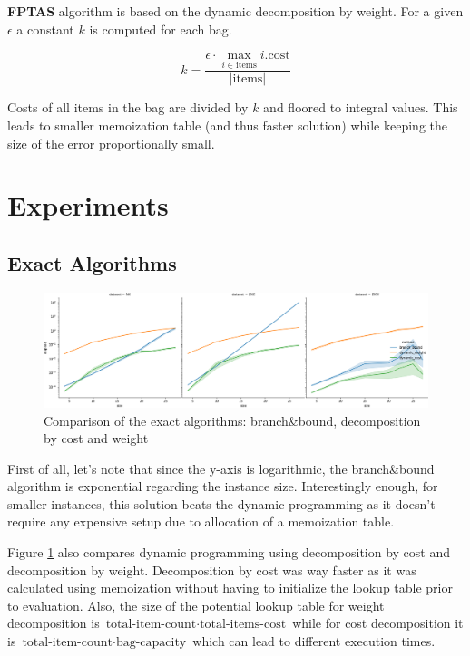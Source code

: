 \documentclass[a4paper,10pt]{article}
\begin{document}
\textbf{FPTAS} algorithm is based on the dynamic decomposition by weight. For a given $\epsilon$ a constant $k$ is computed for each bag. 

\begin{equation}
k = \frac{\epsilon \cdot \max_{i \in \textrm{items}} i.\textrm{cost}}{|\textrm{items}|}
\end{equation}

Costs of all items in the bag are divided by $k$ and floored to integral values. This leads to smaller memoization table (and thus faster solution) while keeping the size of the error proportionally small.
\section{Experiments}

\subsection{Exact Algorithms}

\begin{figure}[!htb]
	\centering
  	\includegraphics[width=\textwidth]{images/exacts_comparison.png}
	\caption{Comparison of the exact algorithms: branch\&bound, decomposition by cost and weight}
	\label{exacts_comparison}
\end{figure}

First of all, let's note that since the y-axis is logarithmic, the branch\&bound algorithm is exponential regarding the instance size. Interestingly enough, for smaller instances, this solution beats the dynamic programming as it doesn't require any expensive setup due to allocation of a memoization table.

Figure \ref{exacts_comparison} also compares dynamic programming using decomposition by cost and decomposition by weight. Decomposition by cost was way faster as it was calculated using memoization without having to initialize the lookup table prior to evaluation. Also, the size of the potential lookup table for weight decomposition is $\textrm{total-item-count} \cdot \textrm{total-items-cost}$ while for cost decomposition it is $\textrm{total-item-count} \cdot \textrm{bag-capacity}$ which can lead to different execution times.
\end{document}
